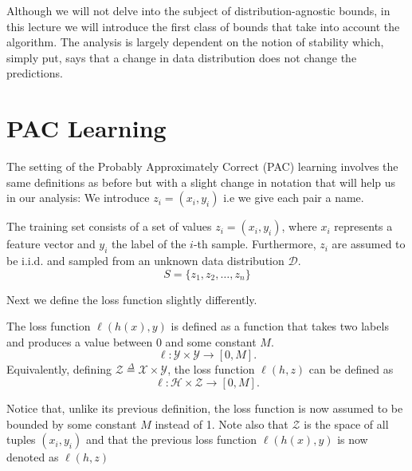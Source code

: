\documentclass{article}
\begin{document}
Although we will not delve into the subject of distribution-agnostic bounds, in this lecture we will introduce the first class of bounds that take into account the algorithm. The analysis is largely dependent on the notion of stability which, simply put, says that a change in data distribution does not change the predictions. 



\section{PAC Learning}
The setting of the Probably Approximately Correct (PAC) learning involves the same definitions as before but with a slight change in notation that will help us in our analysis: We introduce $z_i=(x_i,y_i)$ i.e we give each pair a name. 

\begin{defn}
The training set consists of a set of values $z_i=(x_i,y_i)$, where $x_i$ represents a feature vector and $y_i$ the label of the $i$-th sample. Furthermore, $z_i$ are assumed to be i.i.d. and sampled from an unknown data distribution $\mathcal{D}$. 
\[
	S = \{z_1, z_2, \dots, z_n\}
\]
\end{defn}
 Next we define the loss function slightly differently. 
\begin{defn} The loss function $\ell(h(x),y)$ is defined as a function that takes two labels and produces a value between $0$ and some constant $M$. 
\[
	\ell: \mathcal{Y} \times \mathcal{Y} \longrightarrow [0,M].
\]
Equivalently, defining $\mathcal{Z}\overset{\Delta}{=}\mathcal{X}\times \mathcal{Y}$,  the loss function $\ell (h,z)$  can be defined as 
\[
	\ell: \mathcal{H} \times \mathcal{Z} \longrightarrow [0,M].
\]
\end{defn}
Notice that, unlike its previous definition, the loss function is now assumed to be bounded by some constant $M$ instead of 1. 
Note also that $\mathcal{Z}$ is the space of all tuples $(x_i,y_i) $ and that the previous loss function $\ell(h(x),y)$ is now denoted as $\ell(h,z)$
\end{document}
